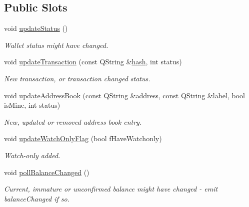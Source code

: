 \subsection*{Public Slots}
\begin{DoxyCompactItemize}
\item 
void \hyperlink{class_wallet_model_a89180a13e5b0c2ca7732164b9dec3806}{update\+Status} ()
\begin{DoxyCompactList}\small\item\em Wallet status might have changed. \end{DoxyCompactList}\item 
void \hyperlink{class_wallet_model_ad63ff7c16477dc5795c95b56593f2e9f}{update\+Transaction} (const Q\+String \&\hyperlink{cache_8cc_a11ecb029164e055f28f4123ce3748862}{hash}, int status)
\begin{DoxyCompactList}\small\item\em New transaction, or transaction changed status. \end{DoxyCompactList}\item 
void \hyperlink{class_wallet_model_ae2f0c65e5e19e71dc4766dfeb0425e99}{update\+Address\+Book} (const Q\+String \&address, const Q\+String \&label, bool is\+Mine, int status)
\begin{DoxyCompactList}\small\item\em New, updated or removed address book entry. \end{DoxyCompactList}\item 
void \hyperlink{class_wallet_model_add90646b2ed03348dc2d6b415fa02a4e}{update\+Watch\+Only\+Flag} (bool f\+Have\+Watchonly)
\begin{DoxyCompactList}\small\item\em Watch-\/only added. \end{DoxyCompactList}\item 
void \hyperlink{class_wallet_model_a51469b2d95cfd4bc0a14ee456fca7b95}{poll\+Balance\+Changed} ()
\begin{DoxyCompactList}\small\item\em Current, immature or unconfirmed balance might have changed -\/ emit \textquotesingle{}balance\+Changed\textquotesingle{} if so. \end{DoxyCompactList}\end{DoxyCompactItemize}
